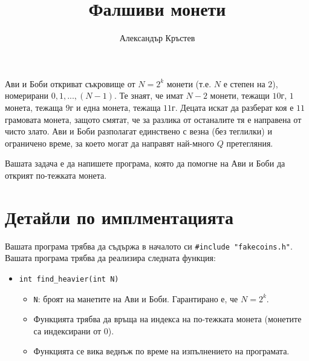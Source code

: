 \documentclass[a4paper,11pt]{article}
\title{Фалшиви монети}
\author{Александър Кръстев}
\date{}
\newcommand{\code}[1]{\texttt{#1}}
\newcommand{\noskip}{\vspace{-\parskip}}
\begin{document}
{%
    \centering \LARGE 
    \textbf{\@title}
    \par
}

Ави и Боби откриват съкровище от $N=2^k$ монети (т.е. $N$ е степен на $2$),
номерирани $0, 1, ..., (N-1)$.
Те знаят, че имат $N-2$ монети, тежащи $10$г, $1$ монета, тежаща $9$г
и една монета, тежаща $11$г.
Децата искат да разберат коя е $11$ грамовата монета, защото смятат, че
за разлика от останалите тя е направена от чисто злато.
Ави и Боби разполагат единствено с везна (без теглилки) и ограничено време,
за което могат да направят най-много $Q$ претегляния.

Вашата задача е да напишете програма, която да помогне на Ави и Боби да открият
по-тежката монета.

\section*{Детайли по имплментацията}
Вашата програма трябва да съдържа в началото си \code{\#include "fakecoins.h"}.
\\
Вашата програма трябва да реализира следната функция:

\noskip
\begin{itemize}
    \item \code{int find\_heavier(int N)}
    \begin{itemize}%
        \item \code{N}: броят на манетите на Ави и Боби. Гарантирано е, че 
            $N = 2^k$.
        \item Функцията трябва да връща на индекса на по-тежката монета 
            (монетите са индексирани от $0$).
        \item Функцията се вика веднъж по време на изпълнението на програмата.
    \end{itemize}
\end{itemize}
\end{document}
